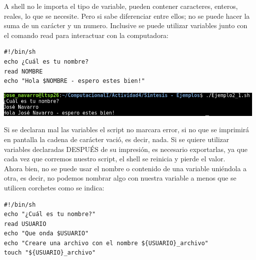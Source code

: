 \documentclass[12pt]{article}
\begin{document}
A shell no le importa el tipo de variable, pueden contener caracteres, enteros, reales, lo que se necesite. Pero si sabe diferenciar entre ellos; no se puede hacer la suma de un carácter y un numero. Inclusive se puede utilizar variables junto con el comando read para interactuar con la computadora:

\begin{verbatim}
#!/bin/sh
echo ¿Cuál es tu nombre?
read NOMBRE
echo "Hola $NOMBRE - espero estes bien!"
\end{verbatim}

\begin{center}
\includegraphics[scale=0.55]{Ej2_1.png}
\end{center} 

Si se declaran mal las variables el script no marcara error, si no que se imprimirá en pantalla la cadena de carácter vació, es decir, nada. Si se quiere utilizar variables declaradas DESPUÉS de su impresión, es necesario exportarlas, ya que cada vez que corremos nuestro script, el shell se reinicia y pierde el valor.  \\

Ahora bien, no se puede usar el nombre o contenido de una variable uniéndola a otra, es decir, no podemos nombrar algo con nuestra variable a menos que se utilicen corchetes como se indica:

\begin{verbatim}
#!/bin/sh
echo "¿Cuál es tu nombre?"
read USUARIO
echo "Que onda $USUARIO"
echo "Creare una archivo con el nombre ${USUARIO}_archivo"
touch "${USUARIO}_archivo"
\end{verbatim}
\end{document}
